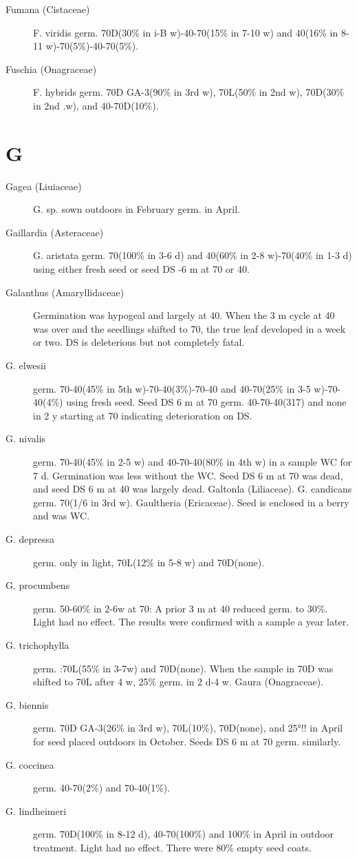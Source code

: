 \begin{description}
\item[Fumana (Cistaceae)] F. viridis germ. 70D(30\% in i-B w)-40-70(15\% in 7-10
w) and 40(16\% in 8-11 w)-70(5\%)-40-70(5\%).

\item[Fuschia (Onagraceae)] F. hybrids germ. 70D GA-3(90\% in 3rd w),
70L(50\% in 2nd w), 70D(30\% in 2nd .w), and 40-70D(10\%).

\end{description}
\section{G}
\begin{description}

\item[Gagea (Liuiaceae)] G. sp. sown outdoors in February germ. in April.
\item[Gaillardia (Asteraceae)] G. aristata germ. 70(100\% in 3-6 d) and 40(60\% in
2-8 w)-70(40\% in 1-3 d) using either fresh seed or seed DS -6 m at 70 or 40.

\item[Galanthus (Amaryllidaceae)] Germination was hypogeal and largely at
40. When the 3 m cycle at 40 was over and the seedlings shifted to 70, the true leaf
developed in a week or two. DS is deleterious but not completely fatal.
\item[G. elwesii] germ. 70-40(45\% in 5th w)-70-40(3\%)-70-40 and 40-70(25\% in 3-5
w)-70-40(4\%) using fresh seed. Seed DS 6 m at 70 germ. 40-70-40(317) and none in
2 y starting at 70 indicating deterioration on DS.
\item[G. nivalis] germ. 70-40(45\% in 2-5 w) and 40-70-40(80\% in 4th w) in a sample
WC for 7 d. Germination was less without the WC. Seed DS 6 m at 70 was dead, and
seed DS 6 m at 40 was largely dead.
Galtonla (Liliaceae). G. candicans germ. 70(1/6 in 3rd w).
Gaultheria (Ericaceae). Seed is enclosed in a berry and was WC.
\item[G. depressa] germ. only in light, 70L(12\% in 5-8 w) and 70D(none).
\item[G. procumbens] germ. 50-60\% in 2-6w at 70: A prior 3 m at 40 reduced germ. to
30\%. Light had no effect. The results were confirmed with a sample a year later.
\item[G. trichophylla] germ. :70L(55\% in 3-7w) and 70D(none). When the sample in
70D was shifted to 70L after 4 w, 25\% germ. in 2 d-4 w.
Gaura (Onagraceae).
\item[G. biennis] germ. 70D GA-3(26\% in 3rd w), 70L(10\%), 70D(none), and 25°!! in
April for seed placed outdoors in October. Seeds DS 6 m at 70 germ. similarly.
\item[G. coccinea] germ. 40-70(2\%) and 70-40(1\%).
\item[G. lindheimeri] germ. 70D(100\% in 8-12 d), 40-70(100\%) and 100\% in April in
outdoor treatment. Light had no effect. There were 80\% empty seed coats.


\end{description}
